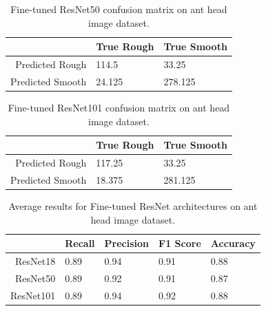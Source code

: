 \documentclass[12pt]{article}
\begin{document}
\vspace{0.5in}

\begin{table}[h]
    \centering
    \caption{Fine-tuned ResNet50 confusion matrix on ant head image dataset.}
    \begin{tabular}{r|ll}
                         & True Rough & True Smooth \\
        \hline
        Predicted Rough  & 114.5      & 33.25       \\
        Predicted Smooth & 24.125     & 278.125     \\
    \end{tabular}
    \label{tab:fresnet50_confusion_matrix}
\end{table}

\vspace{0.5in}

\begin{table}[h]
    \centering
    \caption{Fine-tuned ResNet101 confusion matrix on ant head image dataset.}
    \begin{tabular}{r|ll}
                         & True Rough & True Smooth \\
        \hline
        Predicted Rough  & 117.25     & 33.25       \\
        Predicted Smooth & 18.375     & 281.125     \\
    \end{tabular}
    \label{tab:fresnet101_confusion_matrix}
\end{table}

\vspace{0.5in}

\begin{table}[h]
    \centering
    \caption{Average results for Fine-tuned ResNet architectures on ant head image dataset.}
    \begin{tabular}{r|llll}
                  & Recall & Precision & F1 Score & Accuracy \\
        \hline
        ResNet18  & 0.89   & 0.94      & 0.91     & 0.88     \\
        ResNet50  & 0.89   & 0.92      & 0.91     & 0.87     \\
        ResNet101 & 0.89   & 0.94      & 0.92     & 0.88     \\
    \end{tabular}
    \label{tab:fresnet_results}
\end{table}
\end{document}
